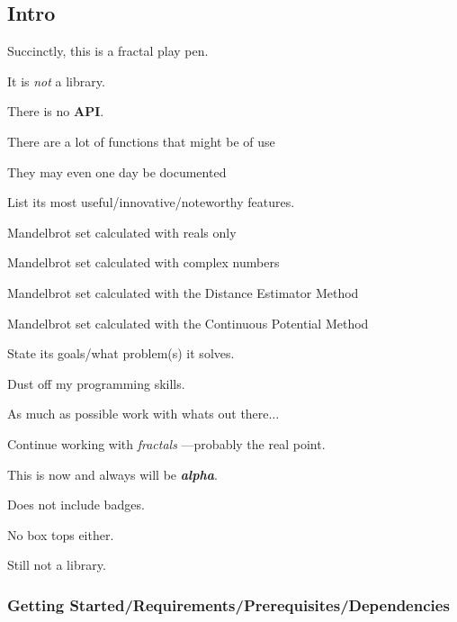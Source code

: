 \subsection*{Intro}


\begin{DoxyItemize}
\item Succinctly, this is a fractal play pen.
\item It is {\itshape not} a library.
\item There is no {\bfseries A\+PI}.
\begin{DoxyItemize}
\item There are a lot of functions that might be of use
\item They may even one day be documented
\end{DoxyItemize}
\item List its most useful/innovative/noteworthy features.
\begin{DoxyItemize}
\item Mandelbrot set calculated with reals only
\item Mandelbrot set calculated with complex numbers
\item Mandelbrot set calculated with the Distance Estimator Method
\item Mandelbrot set calculated with the Continuous Potential Method
\end{DoxyItemize}
\item State its goals/what problem(s) it solves.
\begin{DoxyItemize}
\item Dust off my programming skills.
\item As much as possible work with what\textquotesingle{}s out there{$\dots$}
\item Continue working with {\itshape fractals} ---probably the real point.
\end{DoxyItemize}
\item This is now and always will be {\itshape {\bfseries alpha}}.
\item Does not include badges.
\item No box tops either.
\item Still not a library.
\end{DoxyItemize}

\subsubsection*{Getting Started/\+Requirements/\+Prerequisites/\+Dependencies}

